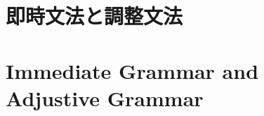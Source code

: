 \documentclass[a4paper,xelatex,ja=standard]{bxjsarticle}
\begin{document}


\ifJPN
  \section{即時文法と調整文法}
\else
  \section{Immediate Grammar and Adjustive Grammar}
\fi
\end{document}
